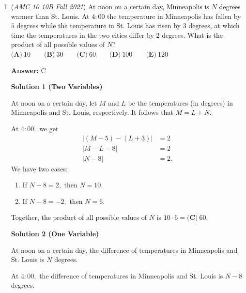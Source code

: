 \begin{enumerate}
Turning term 1 to a fraction:$\frac{2021}{2020}-\frac{2020}{2021}=1+\frac{1}{2020}-\frac{2020}{2021}$

 Subtracting the last term from the first term gives us:$\frac{1}{2021}+\frac{1}{2020}$

 Doing some simple cross multiplication, you get $\frac{4041}{2020\cdot2021}$, here you can see the numerator is $\boxed{\textbf{(E)}4041}$.

 


	\item (\textit{AMC 10 10B Fall 2021}) At noon on a certain day, Minneapolis is $N$ degrees warmer than St. Louis. At $4{:}00$ the temperature in Minneapolis has fallen by $5$ degrees while the temperature in St. Louis has risen by $3$ degrees, at which time the temperatures in the two cities differ by $2$ degrees. What is the product of all possible values of $N?$
$\textbf{(A)}\: 10\qquad\textbf{(B)} \: 30\qquad\textbf{(C)} \: 60\qquad\textbf{(D)} \: 100\qquad\textbf{(E)} \: 120$

 \textbf{Answer: }C



\textbf{Solution 1 (Two Variables)}

At noon on a certain day, let $M$ and $L$ be the temperatures (in degrees) in Minneapolis and St. Louis, respectively. It follows that $M=L+N.$

 At $4{:}00,$ we get
 \begin{align*} |(M-5)-(L+3)| &= 2 \\ |M-L-8| &= 2 \\ |N-8| &= 2. \end{align*}
We have two cases:

 
            \begin{enumerate} 
        \item If $N-8=2,$ then $N=10.$

        \item If $N-8=-2,$ then $N=6.$

            \end{enumerate}
            Together, the product of all possible values of $N$ is $10\cdot6=\boxed{\textbf{(C)} \: 60}.$




\textbf{Solution 2 (One Variable)}

At noon on a certain day, the difference of temperatures in Minneapolis and St. Louis is $N$ degrees.

 At $4{:}00,$ the difference of temperatures in Minneapolis and St. Louis is $N-8$ degrees.


\end{enumerate}
